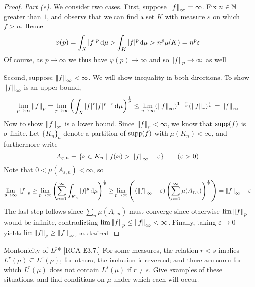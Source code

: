 \begin{proof}
    \emph{Part (e).} We consider two cases. First, suppose \(\norm{f}_\infty = \infty\). Fix \(n \in \mathbb{N}\) greater than \(1\), and observe that we can find a set \(K\) with measure \(\varepsilon\) on which \(f > n\). Hence
    \[
        \varphi(p) = \int_X |f|^p \, \mathrm{d}\mu > \int_K |f|^p \, \mathrm{d}\mu > n^p \mu(K) = n^p \varepsilon
    \]
    Of course, as \(p \to \infty\) we thus have \(\varphi(p) \to \infty\) and so \(\norm{f}_p \to \infty\) as well. 
    \stdvspace

    Second, suppose \(\norm{f}_\infty < \infty\). We will show inequality in both directions. To show \(\norm{f}_\infty\) is an upper bound, 
    \[
        \lim_{p \to \infty} \norm{f}_p = \lim_{p \to \infty} \left( \int_X |f|^r |f|^{p-r} \, \mathrm{d}\mu \right)^{\frac{1}{p}} 
        \leq \lim_{p \to \infty} (\norm{f}_\infty)^{1 - \frac{r}{p}} (\norm{f}_r)^{\frac{r}{p}}
        = \norm{f}_\infty
    \]
    Now to show \(\norm{f}_\infty\) is a lower bound. Since \(\norm{f}_r < \infty\), we know that \(\operatorname{supp}(f)\) is \(\sigma\)-finite. Let \(\{K_n\}_n\) denote a partition of \(\operatorname{supp}(f)\) with \(\mu(K_n) < \infty\), and furthermore write 
    \[
        A_{\varepsilon, n} = \{x \in K_n \mid f(x) > \norm{f}_\infty - \varepsilon\}
        \qquad (\varepsilon > 0)
    \]
    Note that \(0 < \mu(A_{\varepsilon, n}) < \infty\), so 
    \[
        \lim_{p \to \infty} \norm{f}_p 
        \geq \lim_{p \to \infty} \left( \sum_{n=1}^\infty \int_{K_n} |f|^p \, \mathrm{d}\mu \right)^{\frac{1}{p}} 
        \geq \lim_{p \to \infty} \left( (\norm{f}_\infty - \varepsilon) \left( \sum_{n=1}^\infty \mu(A_{\varepsilon, n}) \right)^{\frac{1}{p}} \right)
        = \norm{f}_\infty - \varepsilon
    \]
    The last step follows since \(\sum_n \mu(A_{\varepsilon, n})\) must converge since otherwise \(\lim \norm{f}_p\) would be infinite, contradicting \(\lim \norm{f}_p \leq \norm{f}_\infty < \infty\). Finally, taking \(\varepsilon \to 0\) yields \(\lim \norm{f}_p \geq \norm{f}_\infty\), as desired. 
\end{proof}

\begin{problem}{Montonicity of \(L^p\)}*
    [RCA E3.7.] For some measures, the relation \(r < s\) implies \(L^r(\mu) \subseteq L^s(\mu)\); for others, the inclusion is reversed; and there are some for which \(L^r(\mu)\) does not contain \(L^s(\mu)\) if \(r \neq s\). Give examples of these situations, and find conditions on \(\mu\) under which each will occur. 
\end{problem}

